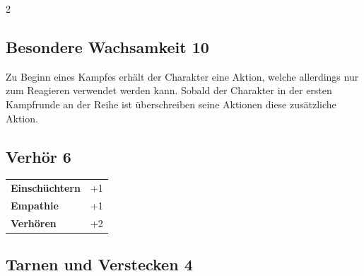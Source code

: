 \begin{multicols}{2}
\begin{tcolorbox}

\end{tcolorbox}

\begin{tcolorbox}
    \subsection*{Besondere Wachsamkeit \hfill \small{10 }}
    \tcblower
Zu Beginn eines Kampfes erhält der Charakter eine Aktion, welche allerdings nur zum Reagieren verwendet werden kann. Sobald der Charakter in der ersten Kampfrunde an der Reihe ist überschreiben seine Aktionen diese zusätzliche Aktion.


\vspace{3mm}



\end{tcolorbox}

\begin{tcolorbox}
    \subsection*{Verhör \hfill \small{6 }}
    \tcblower




\begin{tabular}{@{}ll@{}}
    \textbf{Einschüchtern} & +1\\
    \textbf{Empathie} & +1\\
    \textbf{Verhören} & +2\\
\end{tabular}


\end{tcolorbox}

\begin{tcolorbox}
    \subsection*{Tarnen und Verstecken \hfill \small{4 }}
    \tcblower





\end{tcolorbox}
\end{multicols}
